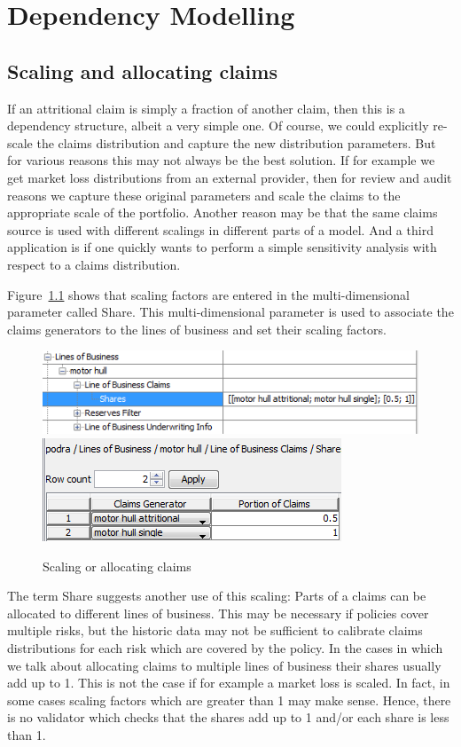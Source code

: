 \chapter{Dependency Modelling}
\label{chap:dependencies}

\section{Scaling and allocating claims}
\label{sec:scalingClaims}
If an attritional claim is simply a fraction of another claim, then this is a dependency structure, albeit a very simple one. Of course, we could explicitly re-scale the claims distribution and capture the new distribution parameters. But for various reasons this may not always be the best solution. If for example we get market loss distributions from an external provider, then for review and audit reasons we capture these original parameters and scale the claims to the appropriate scale of the portfolio. Another reason may be that the same claims source is used with different scalings in different parts of a model. And a third application is if one quickly wants to perform a simple sensitivity analysis with respect to a claims distribution.

Figure~\ref{fig:ScalingClaims} shows that scaling factors are entered in the multi-dimensional parameter called Share. This multi-dimensional parameter is used to associate the claims generators to the lines of business and set their scaling factors. 
\begin{figure}
		\centering
		\includegraphics{images/scalingClaims.png}\\[5mm]
				\includegraphics{images/scalingClaimsDetails.png}
	\caption{Scaling or allocating claims}
	\label{fig:ScalingClaims}
\end{figure}
The term Share suggests another use of this scaling: Parts of a claims can be allocated to different lines of business. This may be necessary if policies cover multiple risks, but the historic data may not be sufficient to calibrate claims distributions for each risk which are covered by the policy. In the cases in which we talk about allocating claims to multiple lines of business their shares usually add up to 1. This is not the case if for example a market loss is scaled. In fact, in some cases scaling factors which are greater than 1 may make sense. Hence, there is no validator which checks that the shares add up to 1 and/or each share is less than 1. 


